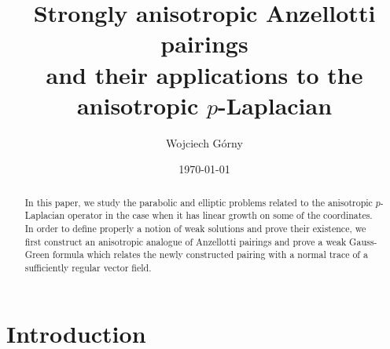 \documentclass[reqno,12pt]{amsart}
\numberwithin{equation}{section}
\begin{document}
	
\title[Strongly anisotropic Anzellotti pairings]{\bf Strongly anisotropic Anzellotti pairings \\ and their applications to the anisotropic $p$-Laplacian}
	
\author[W. G\'{o}rny]{Wojciech G\'{o}rny}
	
\address{ W. G\'{o}rny: Faculty of Mathematics, Universit\"at Wien, Oskar-Morgerstern-Platz 1, 1090 Vienna, Austria; Faculty of Mathematics, Informatics and Mechanics, University of Warsaw, Banacha 2, 02-097 Warsaw, Poland
\hfill\break\indent
{\tt  wojciech.gorny@univie.ac.at }
}
	
%
%
	
	
\setcounter{tocdepth}{1}
	
%
\date{\today}
	
\begin{abstract}
In this paper, we study the parabolic and elliptic problems related to the anisotropic $p$-Laplacian operator in the case when it has linear growth on some of the coordinates. In order to define properly a notion of weak solutions and prove their existence, we first construct an anisotropic analogue of Anzellotti pairings and prove a weak Gauss-Green formula which relates the newly constructed pairing with a normal trace of a sufficiently regular vector field. 
\end{abstract}
	
\maketitle


	
\section{Introduction}
\end{document}
